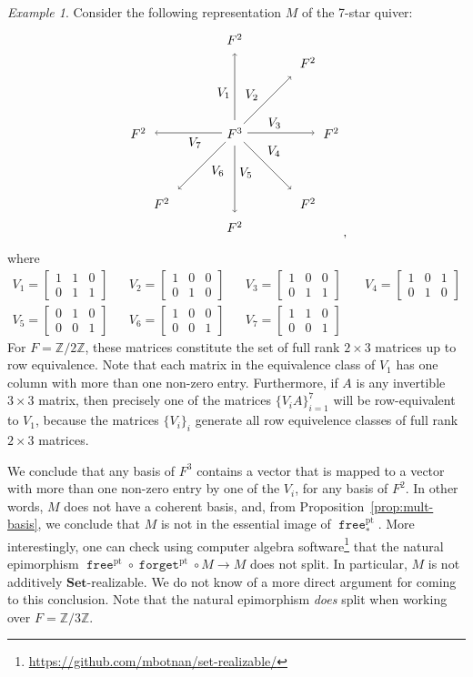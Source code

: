 \documentclass[a4paper]{amsart}
\theoremstyle{plain}
\theoremstyle{definition}
\theoremstyle{remark}
\newtheorem{example}[theorem]{Example}
\newcommand{\funct}[1]{\operatorname{\mathtt{#1}}}
\newcommand{\Set}{\mathbf{Set}}
\newcommand{\Z}{\mathbb{Z}}
\begin{document}
\begin{example}
\label{ex.7star}
Consider the following representation $M$ of the 7-star quiver:
\[
\begin{tikzpicture}[scale=0.7]
\node at (0,0) (o) {$F^3$};
 \foreach \X [count=\Y]in {1,2,3,4,5,6,7}
  \draw[->,shorten <=10pt] (0,0) -- node[auto] {$V_{\X}$}(135-\Y*45:pi) 
   node[label=135-45*\Y: $F^2$]{};
\end{tikzpicture},
\]
where
\begin{align*}
V_1 = \begin{bmatrix} 1 & 1 & 0 \\ 0 & 1 & 1 \end{bmatrix} & & V_2 = \begin{bmatrix} 1 & 0 & 0 \\ 0 & 1 & 0 \end{bmatrix} & & V_3 = \begin{bmatrix} 1 & 0 & 0 \\ 0 & 1 & 1\end{bmatrix} & & V_4 = \begin{bmatrix} 1 & 0 & 1 \\ 0 & 1 & 0 \end{bmatrix}\\  
V_5 = \begin{bmatrix} 0 & 1 & 0 \\ 0 & 0 & 1 \end{bmatrix} & & V_6 = \begin{bmatrix} 1 & 0 & 0 \\ 0 & 0 & 1 \end{bmatrix} & & V_7  = \begin{bmatrix} 1 & 1 & 0 \\ 0 & 0 & 1 \end{bmatrix} & ~ &
\end{align*}
For $F=\Z/2\Z$, these matrices constitute the set of full rank $2\times 3$ matrices up to row equivalence. Note that each matrix in the equivalence class of $V_1$ has one column with more than one non-zero entry. Furthermore, if $A$ is any invertible $3\times 3$ matrix, then precisely one of the matrices $\{V_iA\}_{i=1}^7$ will be row-equivalent to $V_1$, because the matrices $\{V_i\}_{i}$ generate all row equivelence classes of full rank $2\times 3$ matrices.

We conclude that any basis of $F^3$ contains a vector that is mapped to a vector with more than one non-zero entry by one of the $V_i$, for any basis of $F^2$.
In other words, $M$ does not have a coherent basis, and, from Proposition~\ref{prop:mult-basis}, we conclude that $M$ is not in the essential image of $\funct{free}^\mathrm{pt}_*$. More interestingly, one can check using computer algebra software\footnote{\url{https://github.com/mbotnan/set-realizable/}} that the natural epimorphism $\funct{free}^\mathrm{pt} \circ \funct{forget}^\mathrm{pt} \circ M \to M$ does not split. In particular, $M$ is not additively $\Set$-realizable. We do not know of a more direct argument for coming to this conclusion. Note that the natural epimorphism \emph{does} split when working over $F=\Z/3\Z$.
\end{example}
\end{document}
